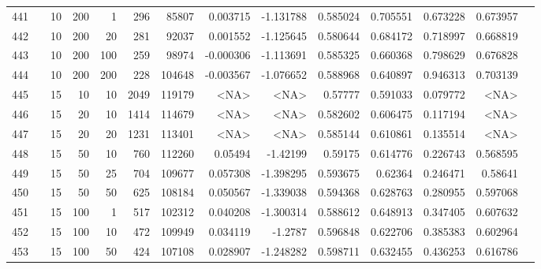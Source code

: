 \begin{longtable}{llrrrrrrrrrrrr}
		441 & &           10 &               200 &            1 &          296 &      85807 &  0.003715 & -1.131788 &  0.585024 &    0.705551 &       0.673228 &  0.673957 \\
		442 & &           10 &               200 &           20 &          281 &      92037 &  0.001552 & -1.125645 &  0.580644 &    0.684172 &       0.718997 &  0.668819 \\
		443 & &           10 &               200 &          100 &          259 &      98974 & -0.000306 & -1.113691 &  0.585325 &    0.660368 &       0.798629 &  0.676828 \\
		444 & &           10 &               200 &          200 &          228 &     104648 & -0.003567 & -1.076652 &  0.588968 &    0.640897 &       0.946313 &  0.703139 \\
		445 & &           15 &                10 &           10 &           2049 &     119179 &      <NA> &      <NA> &   0.57777 &    0.591033 &       0.079772 &  <NA> \\
		446 & &           15 &                20 &           10 &           1414 &     114679 &      <NA> &      <NA> &  0.582602 &    0.606475 &       0.117194 &  <NA> \\
		447 & &           15 &                20 &           20 &           1231 &     113401 &      <NA> &      <NA> &  0.585144 &    0.610861 &       0.135514 &  <NA> \\
		448 & &           15 &                50 &           10 &          760 &     112260 &   0.05494 &  -1.42199 &   0.59175 &    0.614776 &       0.226743 &  0.568595 \\
		449 & &           15 &                50 &           25 &          704 &     109677 &  0.057308 & -1.398295 &  0.593675 &     0.62364 &       0.246471 &   0.58641 \\
		450 & &           15 &                50 &           50 &          625 &     108184 &  0.050567 & -1.339038 &  0.594368 &    0.628763 &       0.280955 &  0.597068 \\
		451 & &           15 &               100 &            1 &          517 &     102312 &  0.040208 & -1.300314 &  0.588612 &    0.648913 &       0.347405 &  0.607632 \\
		452 & &           15 &               100 &           10 &          472 &     109949 &  0.034119 &   -1.2787 &  0.596848 &    0.622706 &       0.385383 &  0.602964 \\
		453 & &           15 &               100 &           50 &          424 &     107108 &  0.028907 & -1.248282 &  0.598711 &    0.632455 &       0.436253 &  0.616786 \\

\end{longtable}
